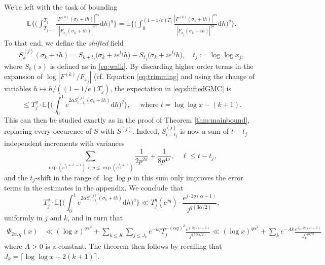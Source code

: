 \documentclass{amsart}
\theoremstyle{definition}
\theoremstyle{remark}
\numberwithin{equation}{section}
\begin{document}
We're left with the task of bounding
\begin{align}\label{eq:shiftedGMC}
        \mathbb{E}\bigg\{\bigg(\int_{T_{j-1}}^{T_{j}}\frac{|F^{(k)}(\sigma_k+ih)|^{2\alpha}}{|F_{x_j}(\sigma_k+ih)|^{2\alpha}}\mathrm{d}h\bigg)^q\bigg\} = \mathbb{E}\bigg\{\bigg(\int_{0}^{(1-1/e)T_{j}}\frac{|F^{(k)}(\sigma_k+ih)|^{2\alpha}}{|F_{x_j}(\sigma_k+ih)|^{2\alpha}}\mathrm{d}h\bigg)^q\bigg\}.
\end{align}
To that end, we define the \textit{shifted} field
\[
        {S}_{k}^{(j)}(\sigma_k+ih)=S_{k+t_j}\big(\sigma_k+ie^{t_j}h\big)-S_{t_j}\big(\sigma_k+ie^{t_j}h\big),\quad t_j:=\log\log x_j,
\]
where $S_k(s)$ is defined as in \eqref{eq:walk}. By discarding higher order terms in the expansion of $\log |F^{(k)}/F_{x_j}|$ (cf.\! Equation \eqref{eq:trimming} and using the  change of variables $h\mapsto h/((1-1/e)T_j)$, the expectation in \eqref{eq:shiftedGMC} is  
\[
    \leq T_{j}^q\cdot \mathbb{E}\bigg\{\bigg(\int_{0}^{1}e^{2\alpha S_{t-t_j}^{(j)}(\sigma_k+ih)}\mathrm{d}h\bigg)^q\bigg\}, \quad \text{ where } t=\log\log x-(k+1).
\]
 This can then be studied exactly as in the proof of Theorem \ref{thm:mainbound}, replacing every occurence of $S$ with $S^{(j)}$. Indeed, $S_{t-t_j}^{(j)}$ is now a sum of $t-t_j$ independent increments with variances
\[
    \sum_{\exp(e^{t_j+\ell-1})< p \leq \exp(e^{t_j+\ell})}\frac{1}{2p^{2\sigma}}+\frac{1}{8p^{4\sigma}},\quad \ell\leq t-t_j,
\]
and the $t_j$-shift in the range of $\log\log p$ in this sum only improves the error terms in the estimates in the appendix. We conclude that
\[
    T_j^q\cdot \mathbb{E}\bigg\{\bigg(\int_{0}^{1}e^{2\alpha S_{t-t_j}^{(j)}(\sigma_k+ih)}\mathrm{d}h\bigg)^q\bigg\} \ll  T_j^{q}(e^{jq})\cdot\frac{e^{j\cdot2q(\alpha-1)}}{j^{q(3\alpha/2)}}, 
\]
{uniformly in $j$ and $k$}, and in turn that 
\begin{align*}
    \Psi_{2\alpha, q}(x)&\ll (\log x)^{q\alpha^2}+\sum_{k\leq K} \sum_{j\leq J_k} e^{-kq}T_{j}^{-(\alpha q)^2}  \frac{e^{j\cdot 2q(\alpha-1)}}{j^{q(3\alpha/2)}}\ll (\log x)^{q\alpha^2}+\sum_{k} e^{-Ak}\frac{e^{J_k\cdot 2q(\alpha-1)}}{J_k^{3q\alpha/2}}
\end{align*}
where $A>0$ is a constant. The theorem then follows by recalling that $J_k=\lceil \log\log x-2(k+1)\rceil$.
\appendix
\end{document}
